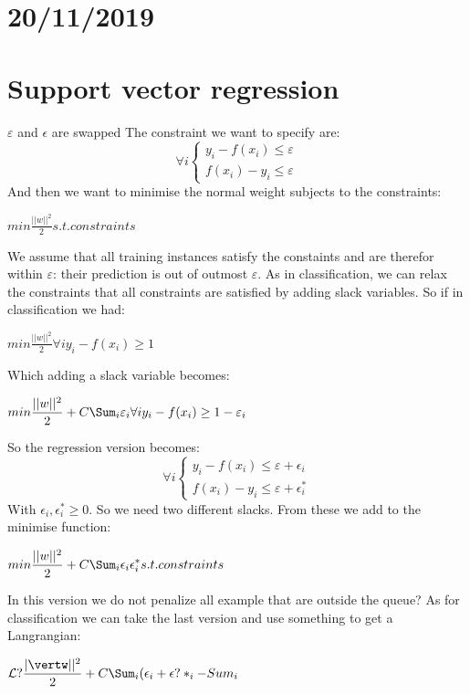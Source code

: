 \chapter{20/11/2019}
\chapter{Support vector regression}
$\varepsilon$ and $\epsilon$ are swapped\newline
The constraint we want to specify are:
\[\forall i
\begin{cases}
	y_i-f(x_i)\leq \varepsilon\\
	f(x_i)-y_i\leq \varepsilon
\end{cases}
\]
And then we want to minimise the normal weight subjects to the constraints:
\begin{center}
	$\displaystyle min\frac{\vert\vert w\vert\vert^2}{2} s.t. constraints$
\end{center}
We assume that all training instances satisfy the constaints and are therefor within $\varepsilon$: their prediction is out of outmost $\varepsilon$.\newline
As in classification, we can relax the constraints that all constraints are satisfied by adding slack variables. So if in classification we had:
\begin{center}
	$\displaystyle min\frac{\vert\vert w \vert\vert^2}{2} \forall i y_i-f(x_i)\geq 1$
\end{center}
Which adding a slack variable becomes:
\begin{center}
	$\displaystyle min\frac{\vert\vert w \vert\vert^2}{2} +C\Sum_i\varepsilon_i \forall i y_i-f(x_i)\geq 1-\varepsilon_i$
\end{center}
So the regression version becomes:
\[\forall i
\begin{cases}
	y_i-f(x_i)\leq \varepsilon+\epsilon_i\\
	f(x_i)-y_i\leq \varepsilon+\epsilon^*_i
\end{cases}
\]
With $\epsilon_i, \epsilon^*_i\geq0$. So we need two different slacks. From these we add to the minimise function:
\begin{center}
	$\displaystyle min\frac{\vert\vert w\vert\vert^2}{2}+C\Sum_i\epsilon_i\epsilon_i^* s.t. constraints$
\end{center}
In this version we do not penalize all example that are outside the queue?\newline
As for classification we can take the last version and use something to get a Langrangian:
\begin{center}
	$\displaystyle \mathcal{L}?\frac{\vert\vertw\vert\vert^2}{2}+C\Sum_i(\epsilon_i+\epsilon?*_i-Sum_i$
\end{center}
